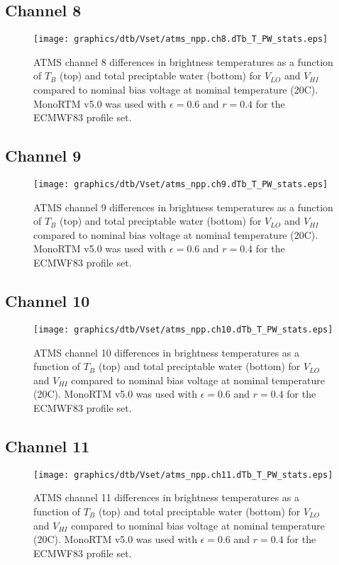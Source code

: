 \subsection{Channel 8}
\begin{figure}[H]
  \label{fig:Vset.ch8_dtb}
  \centering
  \hspace{1.5cm}\texttt{[image: graphics/dtb/Vset/atms\_npp.ch8.dTb\_T\_PW\_stats.eps]}
  \caption{ATMS channel 8 differences in brightness temperatures as a function of $T_B$ (top) and total preciptable water (bottom) for $V_{LO}$ and $V_{HI}$ compared to nominal bias voltage at nominal temperature (20\textdegree{}C). MonoRTM v5.0 was used with $\epsilon=0.6$ and $r=0.4$ for the ECMWF83 profile set.}
\end{figure}

\subsection{Channel 9}
\begin{figure}[H]
  \label{fig:Vset.ch9_dtb}
  \centering
  \hspace{1.5cm}\texttt{[image: graphics/dtb/Vset/atms\_npp.ch9.dTb\_T\_PW\_stats.eps]}
  \caption{ATMS channel 9 differences in brightness temperatures as a function of $T_B$ (top) and total preciptable water (bottom) for $V_{LO}$ and $V_{HI}$ compared to nominal bias voltage at nominal temperature (20\textdegree{}C). MonoRTM v5.0 was used with $\epsilon=0.6$ and $r=0.4$ for the ECMWF83 profile set.}
\end{figure}

\subsection{Channel 10}
\begin{figure}[H]
  \label{fig:Vset.ch10_dtb}
  \centering
  \hspace{1.5cm}\texttt{[image: graphics/dtb/Vset/atms\_npp.ch10.dTb\_T\_PW\_stats.eps]}
  \caption{ATMS channel 10 differences in brightness temperatures as a function of $T_B$ (top) and total preciptable water (bottom) for $V_{LO}$ and $V_{HI}$ compared to nominal bias voltage at nominal temperature (20\textdegree{}C). MonoRTM v5.0 was used with $\epsilon=0.6$ and $r=0.4$ for the ECMWF83 profile set.}
\end{figure}

\subsection{Channel 11}
\begin{figure}[H]
  \label{fig:Vset.ch11_dtb}
  \centering
  \hspace{1.5cm}\texttt{[image: graphics/dtb/Vset/atms\_npp.ch11.dTb\_T\_PW\_stats.eps]}
  \caption{ATMS channel 11 differences in brightness temperatures as a function of $T_B$ (top) and total preciptable water (bottom) for $V_{LO}$ and $V_{HI}$ compared to nominal bias voltage at nominal temperature (20\textdegree{}C). MonoRTM v5.0 was used with $\epsilon=0.6$ and $r=0.4$ for the ECMWF83 profile set.}
\end{figure}

